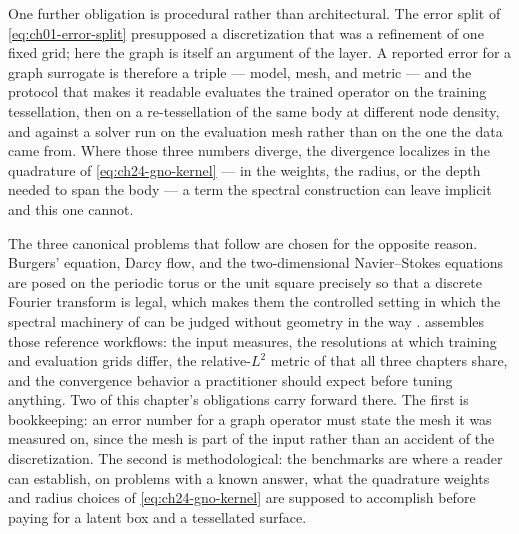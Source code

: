 One further obligation is procedural rather than architectural. The error split of
\eqref{eq:ch01-error-split} presupposed a discretization that was a refinement of one fixed
grid; here the graph is itself an argument of the layer. A reported error for a graph
surrogate is therefore a triple --- model, mesh, and metric --- and the protocol that makes it
readable evaluates the trained operator on the training tessellation, then on a
re-tessellation of the same body at different node density, and against a solver run on the
evaluation mesh rather than on the one the data came from. Where those three numbers diverge,
the divergence localizes in the quadrature of \eqref{eq:ch24-gno-kernel} --- in the weights,
the radius, or the depth needed to span the body --- a term the spectral construction can
leave implicit and this one cannot.



The three canonical problems that follow are chosen for the opposite reason. Burgers'
equation, Darcy flow, and the two-dimensional Navier--Stokes equations are posed on the
periodic torus or the unit square precisely so that a discrete Fourier transform is legal,
which makes them the controlled setting in which the spectral machinery of
 can be judged without geometry in
the way \cite{li2021fourier}. 
assembles those reference workflows: the input measures, the resolutions at which training and
evaluation grids differ, the relative-$L^{2}$ metric of
 that all three chapters share,
and the convergence behavior a practitioner should expect before tuning anything. Two of this
chapter's obligations carry forward there. The first is bookkeeping: an error number for a
graph operator must state the mesh it was measured on, since the mesh is part of the input
rather than an accident of the discretization. The second is methodological: the benchmarks
are where a reader can establish, on problems with a known answer, what the quadrature weights
and radius choices of \eqref{eq:ch24-gno-kernel} are supposed to accomplish before paying for
a latent box and a tessellated surface.

